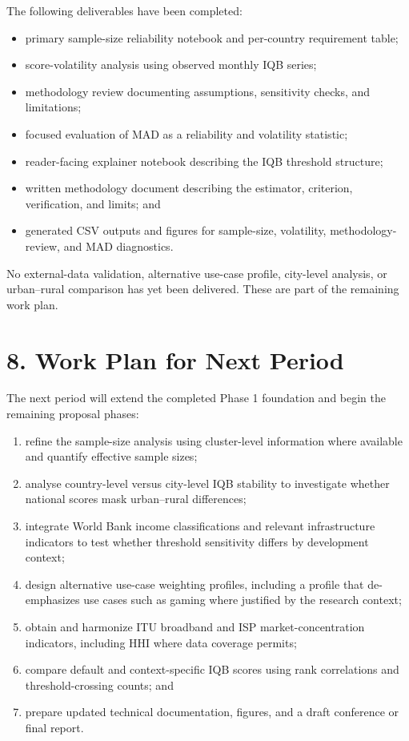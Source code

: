 \documentclass[11pt]{article}
\begin{document}
The following deliverables have been completed:
\begin{itemize}
  \item primary sample-size reliability notebook and per-country requirement table;
  \item score-volatility analysis using observed monthly IQB series;
  \item methodology review documenting assumptions, sensitivity checks, and limitations;
  \item focused evaluation of MAD as a reliability and volatility statistic;
  \item reader-facing explainer notebook describing the IQB threshold structure;
  \item written methodology document describing the estimator, criterion, verification, and limits; and
  \item generated CSV outputs and figures for sample-size, volatility, methodology-review, and MAD
  diagnostics.
\end{itemize}

No external-data validation, alternative use-case profile, city-level analysis, or urban--rural
comparison has yet been delivered. These are part of the remaining work plan.

\section*{8. Work Plan for Next Period}

The next period will extend the completed Phase 1 foundation and begin the remaining proposal phases:
\begin{enumerate}
  \item refine the sample-size analysis using cluster-level information where available and quantify
  effective sample sizes;
  \item analyse country-level versus city-level IQB stability to investigate whether national scores
  mask urban--rural differences;
  \item integrate World Bank income classifications and relevant infrastructure indicators to test
  whether threshold sensitivity differs by development context;
  \item design alternative use-case weighting profiles, including a profile that de-emphasizes use
  cases such as gaming where justified by the research context;
  \item obtain and harmonize ITU broadband and ISP market-concentration indicators, including HHI where
  data coverage permits;
  \item compare default and context-specific IQB scores using rank correlations and threshold-crossing
  counts; and
  \item prepare updated technical documentation, figures, and a draft conference or final report.
\end{enumerate}
\end{document}
